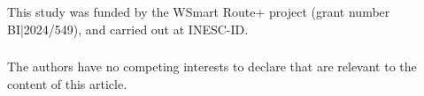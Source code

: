 \documentclass[orivec,runningheads]{llncs}
\begin{document}
\begin{credits}
\subsubsection{\ackname} This study was funded by the WSmart Route+ project (grant number BI|2024/549), and carried out at INESC-ID.

\subsubsection{\discintname}
The authors have no competing interests to declare that are
relevant to the content of this article.
\end{credits}
%
%
%


\end{document}
